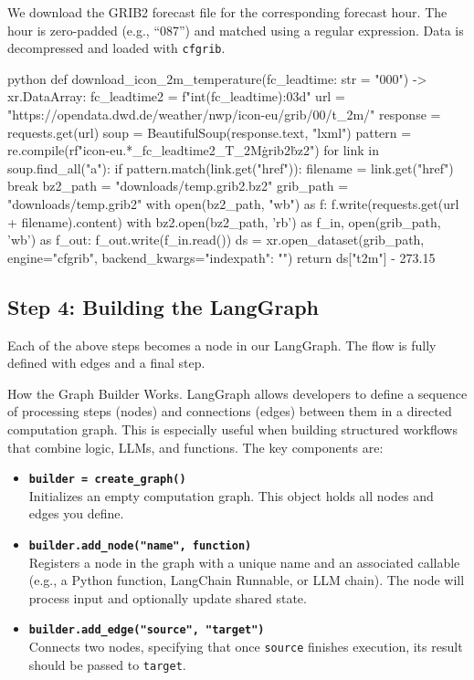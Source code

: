 We download the GRIB2 forecast file for the corresponding forecast hour. The hour is zero-padded (e.g., ``087'') and matched using a regular expression. Data is decompressed and loaded with \texttt{cfgrib}.

\begin{codeonly}{python}
def download_icon_2m_temperature(fc_leadtime: str = "000") -> xr.DataArray:
	fc_leadtime2 = f"{int(fc_leadtime):03d}"
	url = "https://opendata.dwd.de/weather/nwp/icon-eu/grib/00/t_2m/"
	response = requests.get(url)
	soup = BeautifulSoup(response.text, "lxml")
	pattern = re.compile(rf"icon-eu.*_{fc_leadtime2}_T_2M\.grib2\.bz2")
	for link in soup.find_all("a"):
		if pattern.match(link.get("href")):
			filename = link.get("href")
			break
			bz2_path = "downloads/temp.grib2.bz2"
			grib_path = "downloads/temp.grib2"
			with open(bz2_path, "wb") as f:
			f.write(requests.get(url + filename).content)
			with bz2.open(bz2_path, 'rb') as f_in, open(grib_path, 'wb') as f_out:
			f_out.write(f_in.read())
			ds = xr.open_dataset(grib_path, engine="cfgrib", backend_kwargs={"indexpath": ""})
			return ds["t2m"] - 273.15
\end{codeonly}

%
\subsection*{Step 4: Building the LangGraph}

Each of the above steps becomes a node in our LangGraph. The flow is fully defined with edges and a final step.

{How the Graph Builder Works.}
LangGraph allows developers to define a sequence of processing steps (nodes) and connections (edges) between them in a directed computation graph. This is especially useful when building structured workflows that combine logic, LLMs, and functions.
The key components are:
\begin{itemize}
  \item \textbf{\texttt{builder = create\_graph()}} \\
    Initializes an empty computation graph. This object holds all nodes and edges you define.
    
  \item \textbf{\texttt{builder.add\_node("name", function)}} \\
    Registers a node in the graph with a unique name and an associated callable (e.g., a Python function, LangChain Runnable, or LLM chain). The node will process input and optionally update shared state.

  \item \textbf{\texttt{builder.add\_edge("source", "target")}} \\
    Connects two nodes, specifying that once \texttt{source} finishes execution, its result should be passed to \texttt{target}.
\end{itemize}

